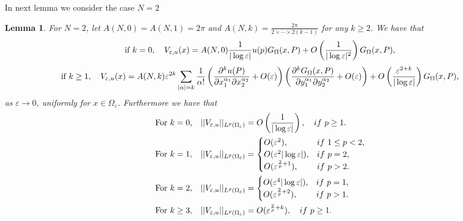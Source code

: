 \documentclass[11pt,reqno]{article}
\newtheorem{lemma}[teo]{Lemma}
\numberwithin{equation}{section}
\newcommand\e\varepsilon
\renewcommand\O\Omega
\begin{document}
			In next lemma we consider the case $N=2$
		\begin{lemma}\label{2l:improvedL2Ve}
			 For $N=2$, let $A(N,0)=A(N,1)=2\pi$ and $A(N,k)=\frac{2\pi}{2\times \cdots\times2(k-1)}$ for any $k\ge 2$.
               We have that
				\begin{equation}\label{eq10102025-1}
				\hbox{if } k=0,\quad	V_{\e,u}(x)=A(N,0)\frac{1}{|\log \e|}u(p)G_\Omega(x,P)+O\left(\frac{1}{|\log \e|^2}\right)G_\Omega(x,P),
				\end{equation}
                \begin{equation}\label{eq10102025-2}
				\hbox{if } k\ge 1,\quad 	V_{\e,u}(x)=A(N,k)\e^{2k}
					\sum_{|\alpha|=k}\frac1{\alpha!}
					\left(\frac{\partial^ku(P)}{\partial x_1^{\alpha_1}\partial x_2^{\alpha_2}}+O(\e)\right)
					\left(\frac{\partial^kG_{\Omega}(x,P)}{\partial y_1^{\alpha_1}\partial y_2^{\alpha_2}}+O(\e)\right)+O\left(\frac{\e^{2+k}}{|\log \e|}\right)G_{\Omega}(x,P),
				\end{equation}
				as $\e\to 0$, uniformly for $x\in\O_\e$. Furthermore we have that
\begin{equation}\label{eq10102025-3}
				\begin{aligned}
				&\hbox{For $k=0$,}\quad
					||V_{\e,u}||_{L^p(\O_\e)}=O\left(\frac{1}{|\log \e|}\right), \quad if\ p\ge 1.
					\\
				&\hbox{For $k=1$,}\quad
					||V_{\e,u}||_{L^p(\O_\e)}=
					\begin{cases}
						O(\e^{2}),  &if\ 1\le p<2,\\
						O(\e^{2}|\log\e|), &if\  p=2,\\
						O(\e^{\frac{2}{p}+1}),   &if\  p>2.\\
					\end{cases}\\
			&	\hbox{For $k= 2$,}\quad
					||V_{\e,u}||_{L^p(\O_\e)}=
					\begin{cases}
						O(\e^{4}|\log\e|), &if\  p=1,\\
						O(\e^{\frac{2}{p}+2}),   &if\  p>1.\\
					\end{cases}\\
		&	\hbox{For $k\ge 3$,}\quad
					||V_{\e,u}||_{L^p(\O_\e)}=	O(\e^{\frac{2}{p}+k}),\quad if \ p\ge 1.
				\end{aligned}
			\end{equation}

            \end{lemma}
\end{document}
